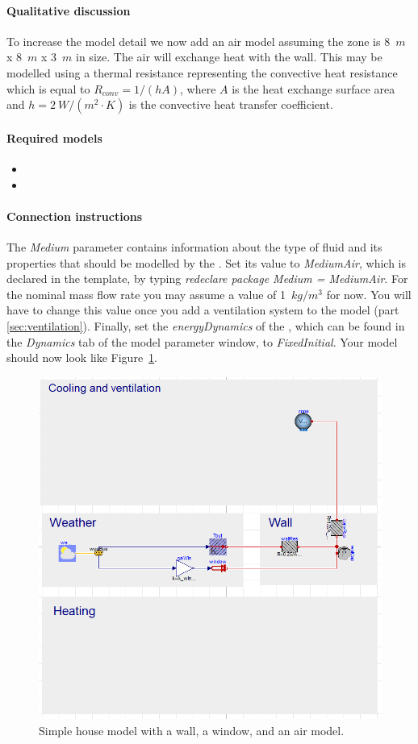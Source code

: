 \documentclass[10pt,a4paper]{article}
\begin{document}
\paragraph{Qualitative discussion}
To increase the model detail we now add an air model assuming the zone is 8~$m$ x 8~$m$ x 3~$m$ in size. The air will exchange heat with the wall. This may be modelled using a thermal resistance representing the convective heat resistance which is equal to $R_{conv}={1}/{(hA)}$, where $A$ is the heat exchange surface area and $h = 2~W/(m^2\cdot K)$ is the convective heat transfer coefficient.

\paragraph{Required models}
\begin{itemize}
\item {}
\item {}
\end{itemize}

\paragraph{Connection instructions}
The  \textit{Medium} parameter contains information about the type of fluid and its properties that should be modelled by the . Set its value to \textit{MediumAir}, which is declared in the template, by typing \textit{redeclare package Medium = MediumAir}. For the nominal mass flow rate you may assume a value of 1~$kg/m^3$ for now. You will have to change this value once you add a ventilation system to the model (part \ref{sec:ventilation}). Finally, set the \textit{energyDynamics} of the , which can be found in the \textit{Dynamics} tab of the model parameter window, to \textit{FixedInitial}. Your model should now look like Figure~\ref{fig:airModel}.
\begin{figure}[h]
\centering
\includegraphics[width=0.45\columnwidth]{img/airModel.png}
\caption{Simple house model with a wall, a window, and an air model.}
\label{fig:airModel}
\end{figure} 
\end{document}
